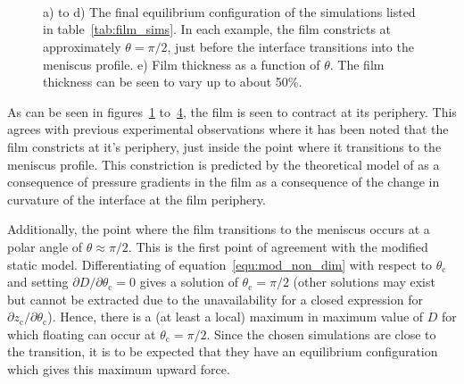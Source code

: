 \documentclass[12pt]{article}
\begin{document}
    \begin{figure}
      \centering
      \begin{subfigure}[b]{0.225\textwidth}
        \resizebox{\textwidth}{!}{\Huge }
        \caption{}
        \label{fig:float1}
      \end{subfigure}
      ~
      \begin{subfigure}[b]{0.225\textwidth}
        \resizebox{\textwidth}{!}{\Huge }
        \caption{}
        \label{fig:float2}
      \end{subfigure}
      ~
      \begin{subfigure}[b]{0.225\textwidth}
        \resizebox{\textwidth}{!}{\Huge }
        \caption{}
        \label{fig:float3}
      \end{subfigure}
      ~
      \begin{subfigure}[b]{0.225\textwidth}
        \resizebox{\textwidth}{!}{\Huge }
        \caption{}
        \label{fig:float4}
      \end{subfigure}

      \begin{subfigure}[b]{0.9\textwidth}
        \resizebox{\textwidth}{!}{\normalsize }
        \caption{}
        \label{fig:film_prof}
      \end{subfigure}
      \caption{a) to d) The final equilibrium configuration of the simulations listed in table~\ref{tab:film_sims}. In each example, the film constricts at approximately $\theta = \pi / 2$, just before the interface transitions into the meniscus profile. e) Film thickness as a function of $\theta$. The film thickness can be seen to vary up to about 50\%.}\label{fig:float_films}
    \end{figure}

As can be seen in figures~\ref{fig:float1} to~\ref{fig:float4}, the film is seen to contract at its periphery. This agrees with previous experimental observations \citep{Hartland68} where it has been noted that the film constricts at it's periphery, just inside the point where it transitions to the meniscus profile. This constriction is predicted by the theoretical model of \citep{Jones78} as a consequence of pressure gradients in the film as a consequence of the change in curvature of the interface at the film periphery. 

Additionally, the point where the film transitions to the meniscus occurs at a polar angle of $\theta \approx \pi / 2$. This is the first point of agreement with the modified static model. Differentiating of equation~\ref{equ:mod_non_dim} with respect to $\theta_{\text{c}}$ and setting $\partial D / \partial \theta_{\text{c}} = 0$ gives a solution of $\theta_{\text{c}} = \pi / 2$ (other solutions may exist but cannot be extracted due to the unavailability for a closed expression for $\partial z_{\text{c}} / \partial \theta_{\text{c}}$). Hence, there is a (at least a local) maximum in maximum value of $D$ for which floating can occur at $\theta_{\text{c}} = \pi / 2$. Since the chosen simulations are close to the transition, it is to be expected that they have an equilibrium configuration which gives this maximum upward force.
\end{document}
